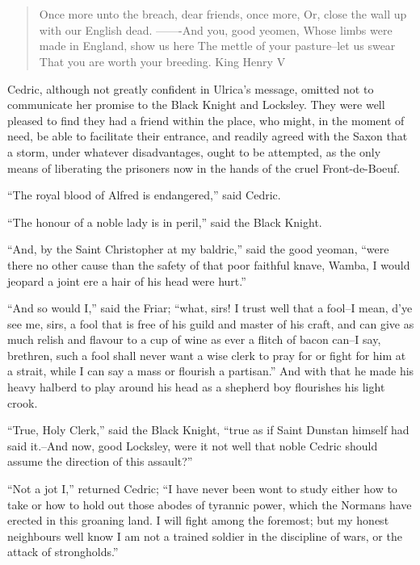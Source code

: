 \chapter{}

\begin{quote}
Once more unto the breach, dear friends, once more,
Or, close the wall up with our English dead.
-------And you, good yeomen,
Whose limbs were made in England, show us here
The mettle of your pasture--let us swear
That you are worth your breeding.
King Henry V
\end{quote}

Cedric, although not greatly confident in Ulrica's message, omitted not
to communicate her promise to the Black Knight and Locksley. They were
well pleased to find they had a friend within the place, who might, in
the moment of need, be able to facilitate their entrance, and readily
agreed with the Saxon that a storm, under whatever disadvantages, ought
to be attempted, as the only means of liberating the prisoners now in
the hands of the cruel Front-de-Boeuf.

``The royal blood of Alfred is endangered,'' said Cedric.

``The honour of a noble lady is in peril,'' said the Black Knight.

``And, by the Saint Christopher at my baldric,'' said the good yeoman,
``were there no other cause than the safety of that poor faithful knave,
Wamba, I would jeopard a joint ere a hair of his head were hurt.''

``And so would I,'' said the Friar; ``what, sirs! I trust well that a
fool--I mean, d'ye see me, sirs, a fool that is free of his guild and
master of his craft, and can give as much relish and flavour to a cup of
wine as ever a flitch of bacon can--I say, brethren, such a fool shall
never want a wise clerk to pray for or fight for him at a strait, while
I can say a mass or flourish a partisan.'' And with that he made his
heavy halberd to play around his head as a shepherd boy flourishes his
light crook.

``True, Holy Clerk,'' said the Black Knight, ``true as if Saint Dunstan
himself had said it.--And now, good Locksley, were it not well that
noble Cedric should assume the direction of this assault?''

``Not a jot I,'' returned Cedric; ``I have never been wont to study
either how to take or how to hold out those abodes of tyrannic power,
which the Normans have erected in this groaning land. I will fight among
the foremost; but my honest neighbours well know I am not a trained
soldier in the discipline of wars, or the attack of strongholds.''

